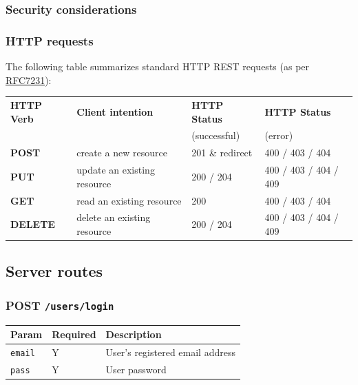 \documentclass[letterpaper, 9pt, onecolumn, twoside, technote, final]{IEEEtran}
\begin{document}
\subsubsection{Security considerations}
\label{sec:org8cffd2a}
\subsubsection{HTTP requests}
\label{sec:org2f62342}

The following table summarizes standard HTTP REST requests (as
per \href{https://tools.ietf.org/html/7231}{RFC7231}):

\begin{center}
\begin{tabular}{llll}
\textbf{HTTP Verb} & \textbf{Client intention} & \textbf{HTTP Status} & \textbf{HTTP Status}\\
 &  & (successful) & (error)\\
\hline
\textbf{POST} & create a new resource & 201 \& redirect & 400 / 403 / 404\\
\textbf{PUT} & update an existing resource & 200 / 204 & 400 / 403 / 404 / 409\\
\textbf{GET} & read an existing resource & 200 & 400 / 403 / 404\\
\textbf{DELETE} & delete an existing resource & 200 / 204 & 400 / 403 / 404 / 409\\
\end{tabular}
\end{center}

\subsection{Server routes}
\label{sec:orgfb80a27}
\subsubsection{POST \texttt{/users/login}}
\label{sec:orgace8e51}

\begin{center}
\begin{tabular}{lll}
\textbf{Param} & \textbf{Required} & \textbf{Description}\\
\hline
\texttt{email} & Y & User's registered email address\\
\texttt{pass} & Y & User password\\
\end{tabular}
\end{center}
\end{document}

